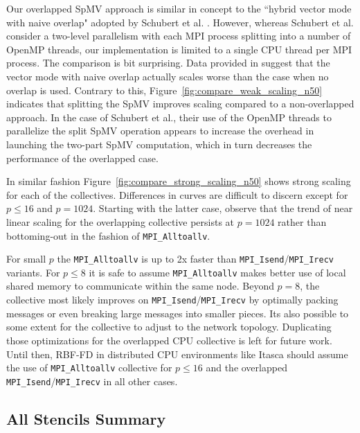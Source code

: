 \documentclass{report}
\begin{document}
Our overlapped SpMV approach is similar in concept to the ``hybrid vector mode with naive overlap" adopted by Schubert et al. \cite{Schubert2011}. However, whereas Schubert et al. consider a two-level parallelism with each MPI process splitting into a number of OpenMP threads, our implementation is limited to a single CPU thread per MPI process. The comparison is bit surprising. Data provided in \cite{Schubert2011} suggest that the vector mode with naive overlap actually scales worse than the case when no overlap is used. Contrary to this, Figure~\ref{fig:compare_weak_scaling_n50} indicates that splitting the SpMV improves scaling compared to a non-overlapped approach. In the case of Schubert et al., their use of the OpenMP threads to parallelize the split SpMV operation appears to increase the overhead in launching the two-part SpMV computation, which in turn decreases the performance of the overlapped case. %

In similar fashion Figure~\ref{fig:compare_strong_scaling_n50} shows strong scaling for each of the collectives. Differences in curves are difficult to discern except for $p \leq 16$ and $p = 1024$. Starting with the latter case, observe that the trend of near linear scaling for the overlapping collective persists at $p=1024$ rather than bottoming-out in the fashion of \texttt{MPI\_Alltoallv}. 

For small $p$ the \texttt{MPI\_Alltoallv} is up to 2x faster than \texttt{MPI\_Isend}/\texttt{MPI\_Irecv} variants. For $p\leq8$ it is safe to assume \texttt{MPI\_Alltoallv} makes better use of local shared memory to communicate within the same node. Beyond $p=8$, the collective most likely improves on \texttt{MPI\_Isend}/\texttt{MPI\_Irecv} by optimally packing messages or even breaking large messages into smaller pieces. Its also possible to some extent for the collective to adjust to the network topology. Duplicating those optimizations for the overlapped CPU collective is left for future work. Until then, RBF-FD in distributed CPU environments like Itasca should assume the use of \texttt{MPI\_Alltoallv} collective for $p \leq 16$ and the overlapped \texttt{MPI\_Isend}/\texttt{MPI\_Irecv} in all other cases. 

\subsection{All Stencils Summary}
\label{sec:scaling_summary}
\end{document}

